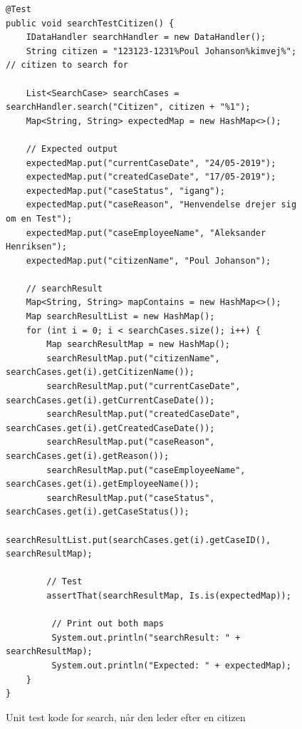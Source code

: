 \begin{figure}
\begin{lstlisting}
@Test
public void searchTestCitizen() {
	IDataHandler searchHandler = new DataHandler();
	String citizen = "123123-1231%Poul Johanson%kimvej%"; // citizen to search for
	
	List<SearchCase> searchCases = searchHandler.search("Citizen", citizen + "%1"); 
	Map<String, String> expectedMap = new HashMap<>();
	
	// Expected output
	expectedMap.put("currentCaseDate", "24/05-2019");
	expectedMap.put("createdCaseDate", "17/05-2019");
	expectedMap.put("caseStatus", "igang");
	expectedMap.put("caseReason", "Henvendelse drejer sig om en Test");
	expectedMap.put("caseEmployeeName", "Aleksander Henriksen");
	expectedMap.put("citizenName", "Poul Johanson");
    
    // searchResult
    Map<String, String> mapContains = new HashMap<>();
    Map searchResultList = new HashMap();
    for (int i = 0; i < searchCases.size(); i++) {
    	Map searchResultMap = new HashMap();
    	searchResultMap.put("citizenName", searchCases.get(i).getCitizenName());
    	searchResultMap.put("currentCaseDate", searchCases.get(i).getCurrentCaseDate());
    	searchResultMap.put("createdCaseDate", searchCases.get(i).getCreatedCaseDate());
    	searchResultMap.put("caseReason", searchCases.get(i).getReason());
    	searchResultMap.put("caseEmployeeName", searchCases.get(i).getEmployeeName());
    	searchResultMap.put("caseStatus", searchCases.get(i).getCaseStatus());
    	searchResultList.put(searchCases.get(i).getCaseID(), searchResultMap);
    	
    	// Test
    	assertThat(searchResultMap, Is.is(expectedMap));
    	
    	 // Print out both maps
    	 System.out.println("searchResult: " + searchResultMap);
    	 System.out.println("Expected: " + expectedMap);
	}
}

\end{lstlisting}
\caption{Unit test kode for search, når den leder efter en citizen}
\label{kode:searchcitizen}
\end{figure}
\newpage